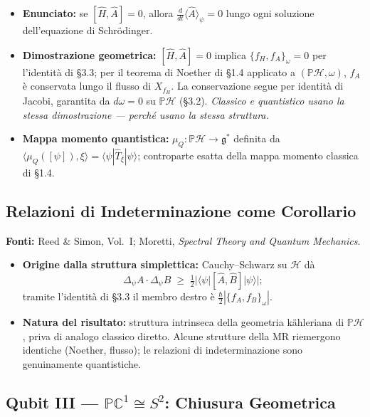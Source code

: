 \documentclass[12pt, a4paper]{article}
\newcommand{\fonti}[1]{%
	\begin{fontebox}
		\textcolor{fontecolor}{\footnotesize\textbf{Fonti:} #1}
	\end{fontebox}%
}
\begin{document}
	\begin{itemize}
		\item \textbf{Enunciato:} se $[\hat H,\hat A]=0$, allora $\frac{d}{dt}
		\langle\hat A\rangle_\psi=0$ lungo ogni soluzione dell'equazione di Schrödinger.
		\item \textbf{Dimostrazione geometrica:} $[\hat H,\hat A]=0$ implica
		$\{f_H,f_A\}_\omega=0$ per l'identità di \S3.3; per il teorema di Noether di
		\S1.4 applicato a $(\mathbb{P}\mathcal{H},\omega)$, $f_A$ è conservata lungo
		il flusso di $X_{f_H}$. La conservazione segue per identità di Jacobi, garantita
		da $d\omega=0$ su $\mathbb{P}\mathcal{H}$ (\S3.2). \emph{Classico e quantistico
			usano la stessa dimostrazione --- perché usano la stessa struttura.}
		\item \textbf{Mappa momento quantistica:} $\mu_Q:\mathbb{P}\mathcal{H}\to
		\mathfrak{g}^*$ definita da $\langle\mu_Q([\psi]),\xi\rangle=\langle\psi|
		\hat T_\xi|\psi\rangle$; controparte esatta della mappa momento classica di \S1.4.
	\end{itemize}
	
	\subsection{Relazioni di Indeterminazione come Corollario}
	
	\fonti{Reed \& Simon, Vol.~I; Moretti, \textit{Spectral Theory and Quantum Mechanics}.}
	
	\begin{itemize}
		\item \textbf{Origine dalla struttura simplettica:} Cauchy--Schwarz su $\mathcal{H}$
		dà
		\[
		\Delta_\psi A\cdot\Delta_\psi B \;\geq\;
		\tfrac{1}{2}|\langle\psi|[\hat A,\hat B]|\psi\rangle|;
		\]
		tramite l'identità di \S3.3 il membro destro è $\tfrac{\hbar}{2}|\{f_A,f_B\}_\omega|$.
		\item \textbf{Natura del risultato:} struttura intrinseca della geometria kähleriana
		di $\mathbb{P}\mathcal{H}$, priva di analogo classico diretto. Alcune strutture
		della MR riemergono identiche (Noether, flusso); le relazioni di indeterminazione
		sono genuinamente quantistiche.
	\end{itemize}
	
	\subsection{Qubit III --- $\mathbb{P}\mathbb{C}^1 \cong S^2$: Chiusura Geometrica}
	
\end{document}
